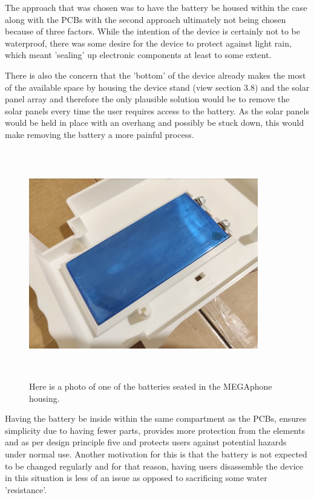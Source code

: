 The approach that was chosen was to have the battery be housed within the case along with the PCBs with the second approach ultimately not being chosen because of three factors.
While the intention of the device is certainly not to be waterproof, there was some desire for the device to protect against light rain, which meant 'sealing' up electronic components at least to some extent.

There is also the concern that the 'bottom' of the device already makes the most of the available space by housing the device stand (view section 3.8) and the solar panel array and therefore the only plausible solution would be to remove the solar panels every time the user requires access to the battery.
As the solar panels would be held in place with an overhang and possibly be stuck down, this would make removing the battery a more painful process.

\begin{figure} [h]
    \centering
    \includegraphics[width=10cm,height=10cm,keepaspectratio]{Figures/battery_housing.png}
    \caption{Here is a photo of one of the batteries seated in the MEGAphone housing.}
    \label{fig:Battery}
\end{figure}

Having the battery be inside within the same compartment as the PCBs, ensures simplicity due to having fewer parts, provides more protection from the elements and as per design principle five and protects users against potential hazards under normal use.
Another motivation for this is that the battery is not expected to be changed regularly and for that reason, having users disassemble the device in this situation is less of an issue as opposed to sacrificing some water 'resistance'.

